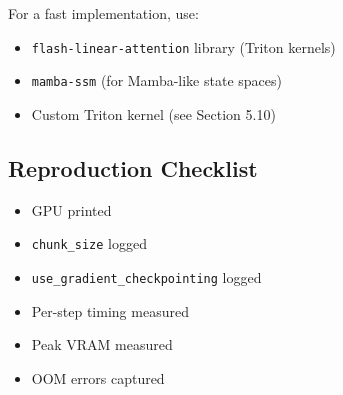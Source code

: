 For a fast implementation, use:

\begin{itemize}
\item \texttt{flash-linear-attention} library (Triton kernels)
\item \texttt{mamba-ssm} (for Mamba-like state spaces)
\item Custom Triton kernel (see Section 5.10)

\end{itemize}
\subsection{Reproduction Checklist}

\begin{itemize}
\item [ ] GPU printed
\item [ ] \texttt{chunk\_size} logged
\item [ ] \texttt{use\_gradient\_checkpointing} logged
\item [ ] Per-step timing measured
\item [ ] Peak VRAM measured
\item [ ] OOM errors captured

\end{itemize}
